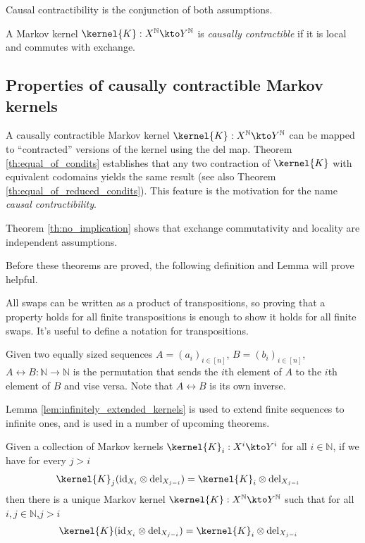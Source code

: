 Causal contractibility is the conjunction of both assumptions.
\begin{definition}
A Markov kernel $\kernel{K}:X^{\mathbb{N}}\kto Y^{\mathbb{N}}$ is \emph{causally contractible} if it is local and commutes with exchange.
\end{definition}

\subsection{Properties of causally contractible Markov kernels}

A causally contractible Markov kernel $\kernel{K}:X^{\mathbb{N}}\kto Y^{\mathbb{N}}$ can be mapped to ``contracted'' versions of the kernel using the $\text{del}$ map. Theorem \ref{th:equal_of_condits} establishes that any two contraction of $\kernel{K}$ with equivalent codomains yields the same result (see also Theorem \ref{th:equal_of_reduced_condits}). This feature is the motivation for the name \emph{causal contractibility}. 

Theorem \ref{th:no_implication} shows that exchange commutativity and locality are independent assumptions.

Before these theorems are proved, the following definition and Lemma will prove helpful.

All swaps can be written as a product of transpositions, so proving that a property holds for all finite transpositions is enough to show it holds for all finite swaps. It's useful to define a notation for transpositions.
\begin{definition}
Given two equally sized sequences $A=(a_i)_{i\in [n]}$, $B=(b_i)_{i\in [n]}$, ${A\leftrightarrow B}:\mathbb{N}\to \mathbb{N}$ is the permutation that sends the $i$th element of $A$ to the $i$th element of $B$ and vise versa. Note that $A\leftrightarrow B$ is its own inverse.
\end{definition}

Lemma \ref{lem:infinitely_extended_kernels} is used to extend finite sequences to infinite ones, and is used in a number of upcoming theorems.

\begin{lemma}\label{lem:infinitely_extended_kernels}
Given a collection of Markov kernels $\kernel{K}_i:X^i\kto Y^i$ for all $i\in \mathbb{N}$, if we have for every $j>i$
\begin{align}
    \kernel{K}_j(\text{id}_{X_i}\otimes \text{del}_{X_{j-i}}) &= \kernel{K}_i\otimes \text{del}_{X_{j-i}}\label{eq:marginalise_comb}
\end{align} 
then there is a unique Markov kernel $\kernel{K}:X^{\mathbb{N}}\kto Y^{\mathbb{N}}$ such that for all $i,j\in \mathbb{N}$,$j>i$
\begin{align}
    \kernel{K}(\text{id}_{X_i}\otimes \text{del}_{X_{j-i}})&= \kernel{K}_i\otimes \text{del}_{X_{j-i}}
\end{align}
\end{lemma}

